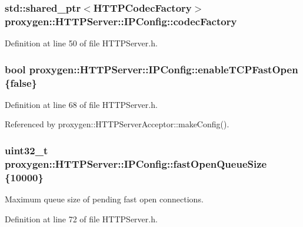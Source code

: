 \subsubsection[{codec\+Factory}]{\setlength{\rightskip}{0pt plus 5cm}std\+::shared\+\_\+ptr$<${\bf H\+T\+T\+P\+Codec\+Factory}$>$ proxygen\+::\+H\+T\+T\+P\+Server\+::\+I\+P\+Config\+::codec\+Factory}\label{structproxygen_1_1HTTPServer_1_1IPConfig_a9cbb47f8038f00ed2a4c9e586d30ad9e}


Definition at line 50 of file H\+T\+T\+P\+Server.\+h.

\subsubsection[{enable\+T\+C\+P\+Fast\+Open}]{\setlength{\rightskip}{0pt plus 5cm}bool proxygen\+::\+H\+T\+T\+P\+Server\+::\+I\+P\+Config\+::enable\+T\+C\+P\+Fast\+Open \{false\}}\label{structproxygen_1_1HTTPServer_1_1IPConfig_a42fa4b9888fee8c22ee4a172a7a76ca0}


Definition at line 68 of file H\+T\+T\+P\+Server.\+h.



Referenced by proxygen\+::\+H\+T\+T\+P\+Server\+Acceptor\+::make\+Config().

\subsubsection[{fast\+Open\+Queue\+Size}]{\setlength{\rightskip}{0pt plus 5cm}uint32\+\_\+t proxygen\+::\+H\+T\+T\+P\+Server\+::\+I\+P\+Config\+::fast\+Open\+Queue\+Size \{10000\}}\label{structproxygen_1_1HTTPServer_1_1IPConfig_a27cdf350c944dbf8a438da74b774e515}
Maximum queue size of pending fast open connections. 

Definition at line 72 of file H\+T\+T\+P\+Server.\+h.



